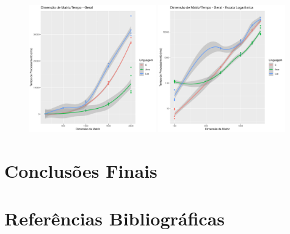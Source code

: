 \documentclass[11pt]{article}
\begin{document}
\begin{figure}[!ht]
    \centering
    \includegraphics[width =0.49\textwidth]{plot_geral.png}
    \includegraphics[width =0.49\textwidth]{plot_log.png}
\end{figure}

\newpage
\section{Conclusões Finais}
\paragraph{}

\newpage
\section{Referências Bibliográficas}


\end{document}
